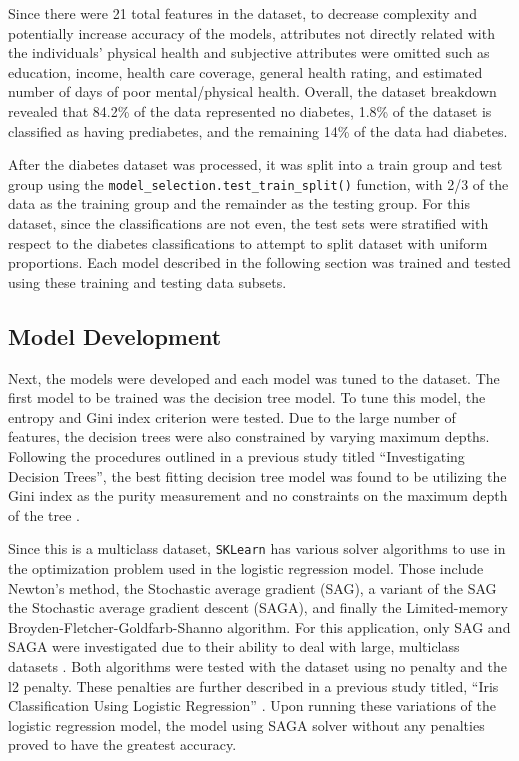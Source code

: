 \documentclass[journal]{IEEEtran}
\begin{document}
Since there were 21 total features in the dataset, to decrease complexity and potentially increase accuracy of the models, attributes not directly related with the individuals' physical health and subjective attributes were omitted such as education, income, health care coverage, general health rating, and estimated number of days of poor mental/physical health. Overall, the dataset breakdown revealed that 84.2\% of the data represented no diabetes, 1.8\% of the dataset is classified as having prediabetes, and the remaining 14\% of the data had diabetes. 

After the diabetes dataset was processed, it was split into a train group and test group using the \lstinline{model_selection.test_train_split()} function, with 2/3 of the data as the training group and the remainder as the testing group. For this dataset, since the classifications are not even, the test sets were stratified with respect to the diabetes classifications to attempt to split dataset with uniform proportions. Each model described in the following section was trained and tested using these training and testing data subsets. 

\subsection{Model Development}

Next, the models were developed and each model was tuned to the dataset. The first model to be trained was the decision tree model. To tune this model, the entropy and Gini index criterion were tested. Due to the large number of features, the decision trees were also constrained by varying maximum depths. Following the procedures outlined in a previous study titled “Investigating Decision Trees”, the best fitting decision tree model was found to be utilizing the Gini index as the purity measurement and no constraints on the maximum depth of the tree \cite{b4}.

Since this is a multiclass dataset, \lstinline{SKLearn} has various solver algorithms to use in the optimization problem used in the logistic regression model. Those include Newton's method, the Stochastic average gradient (SAG), a variant of the SAG the Stochastic average gradient descent (SAGA), and finally the Limited-memory Broyden-Fletcher-Goldfarb-Shanno algorithm. For this application, only SAG and SAGA were investigated due to their ability to deal with large, multiclass datasets \cite{b5}. Both algorithms were tested with the dataset using no penalty and the l2 penalty. These penalties are further described in a previous study titled, “Iris Classification Using Logistic Regression” \cite{b6}. Upon running these variations of the logistic regression model, the model using SAGA solver without any penalties proved to have the greatest accuracy.  
\end{document}
